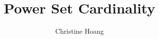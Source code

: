 \documentclass{article}
\title{Power Set Cardinality}
\author{Christine Hoang}
\begin{document}
\maketitle

\section{}
\end{document}
